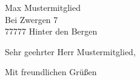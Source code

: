 \documentclass{bingoevletter}
\begin{document}
\begin{letter}{%
		Max Mustermitglied\\
		Bei Zwergen 7\\
		77777 Hinter den Bergen%
	}
	\opening{Sehr geehrter Herr Mustermitglied,}

	\blindtext

	\closing{Mit freundlichen Grüßen}
	\end{letter}
\end{document}
